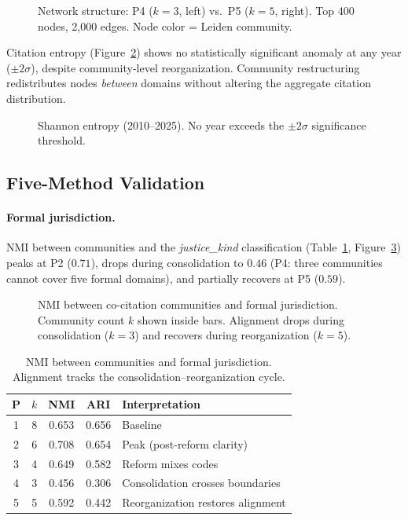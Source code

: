 \documentclass[11pt]{article}
\begin{document}
\begin{figure}[t]
\centering

\caption{Network structure: P4 ($k=3$, left) vs.\ P5 ($k=5$, right). Top 400 nodes, 2{,}000 edges. Node color = Leiden community.}
\label{fig:network}
\end{figure}

Citation entropy (Figure~\ref{fig:entropy}) shows no statistically significant anomaly at any year ($\pm 2\sigma$), despite community-level reorganization.
Community restructuring redistributes nodes \emph{between} domains without altering the aggregate citation distribution.

\begin{figure}[t]
\centering

\caption{Shannon entropy (2010--2025). No year exceeds the $\pm 2\sigma$ significance threshold.}
\label{fig:entropy}
\end{figure}

\subsection{Five-Method Validation}

\paragraph{Formal jurisdiction.}
NMI between communities and the \emph{justice\_kind} classification (Table~\ref{tab:validation}, Figure~\ref{fig:validation_jk}) peaks at P2 ($0.71$), drops during consolidation to $0.46$ (P4: three communities cannot cover five formal domains), and partially recovers at P5 ($0.59$).

\begin{figure}[t]
\centering

\caption{NMI between co-citation communities and formal jurisdiction. Community count $k$ shown inside bars. Alignment drops during consolidation ($k{=}3$) and recovers during reorganization ($k{=}5$).}
\label{fig:validation_jk}
\end{figure}

\begin{table}[t]
\centering
\small
\caption{NMI between communities and formal jurisdiction. Alignment tracks the consolidation--reorganization cycle.}
\label{tab:validation}
\begin{tabular}{@{}ccccl@{}}
\toprule
\textbf{P} & $k$ & \textbf{NMI} & \textbf{ARI} & \textbf{Interpretation} \\
\midrule
1 & 8 & 0.653 & 0.656 & Baseline \\
2 & 6 & 0.708 & 0.654 & Peak (post-reform clarity) \\
3 & 4 & 0.649 & 0.582 & Reform mixes codes \\
4 & 3 & 0.456 & 0.306 & Consolidation crosses boundaries \\
5 & 5 & 0.592 & 0.442 & Reorganization restores alignment \\
\bottomrule
\end{tabular}
\end{table}
\end{document}
